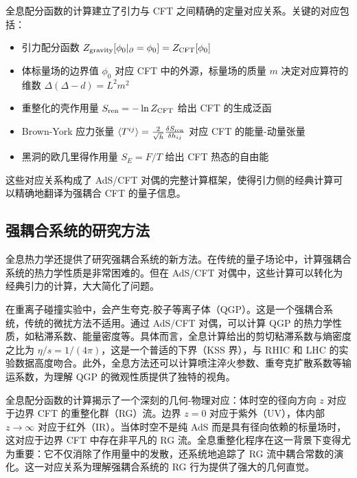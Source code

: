 \begin{note}[全息配分函数的完整字典]
全息配分函数的计算建立了引力与 CFT 之间精确的定量对应关系。关键的对应包括：
\begin{itemize}
    \item 引力配分函数 $Z_{\rm gravity}[\phi_0|_{\partial} = \phi_0] = Z_{\rm CFT}[\phi_0]$
    \item 体标量场的边界值 $\phi_0$ 对应 CFT 中的外源，标量场的质量 $m$ 决定对应算符的维数 $\Delta(\Delta - d) = L^2 m^2$
    \item 重整化的壳作用量 $S_{\rm ren} = -\ln Z_{\rm CFT}$ 给出 CFT 的生成泛函
    \item Brown-York 应力张量 $\langle T^{ij} \rangle = \frac{2}{\sqrt{h}} \frac{\delta S_{\rm ren}}{\delta h_{ij}}$ 对应 CFT 的能量-动量张量\cite{Balasubramanian1999}
    \item 黑洞的欧几里得作用量 $S_E = F/T$ 给出 CFT 热态的自由能
\end{itemize}
这些对应关系构成了 AdS/CFT 对偶的完整计算框架，使得引力侧的经典计算可以精确地翻译为强耦合 CFT 的量子信息\cite{Skenderis2002}。
\end{note}

\subsection{强耦合系统的研究方法}

全息热力学还提供了研究强耦合系统的新方法。在传统的量子场论中，计算强耦合系统的热力学性质是非常困难的。但在 AdS/CFT 对偶中，这些计算可以转化为经典引力的计算，大大简化了问题。

\begin{example}[夸克-胶子等离子体]
在重离子碰撞实验中，会产生夸克-胶子等离子体（QGP）。这是一个强耦合系统，传统的微扰方法不适用。通过 AdS/CFT 对偶，可以计算 QGP 的热力学性质，如粘滞系数、能量密度等。具体而言，全息计算给出的剪切粘滞系数与熵密度之比为 $\eta/s = 1/(4\pi)$，这是一个普适的下界（KSS 界），与 RHIC 和 LHC 的实验数据高度吻合\cite{Aharony1999}。此外，全息方法还可以计算喷注淬火参数、重夸克扩散系数等输运系数，为理解 QGP 的微观性质提供了独特的视角。
\end{example}

\begin{remark}[重整化群流与全息径向方向]
全息配分函数的计算揭示了一个深刻的几何-物理对应：体时空的径向方向 $z$ 对应于边界 CFT 的重整化群（RG）流。边界 $z=0$ 对应于紫外（UV），体内部 $z \to \infty$ 对应于红外（IR）。当体时空不是纯 AdS 而是具有径向依赖的标量场时，这对应于边界 CFT 中存在非平凡的 RG 流\cite{deHaro2000}。全息重整化程序\cite{Skenderis2002}在这一背景下变得尤为重要：它不仅消除了作用量中的发散，还系统地追踪了 RG 流中耦合常数的演化。这一对应关系为理解强耦合系统的 RG 行为提供了强大的几何直觉。
\end{remark}

